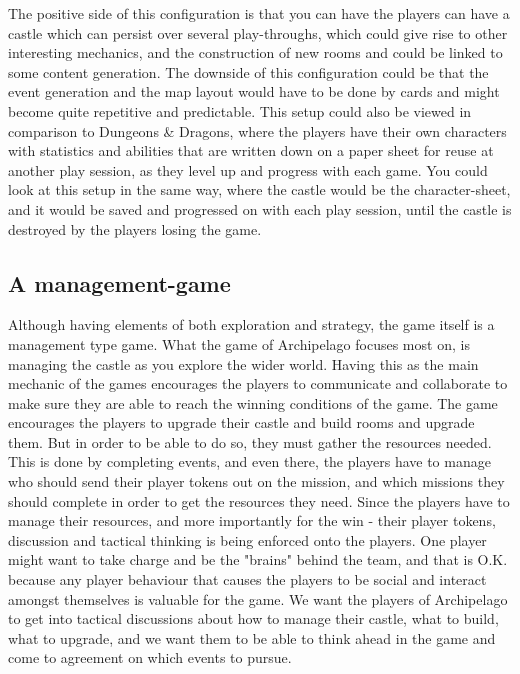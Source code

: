 The positive side of this configuration is that you can have the players can have a castle which can persist over several play-throughs, which could give rise to other interesting mechanics, and the construction of new rooms and could be linked to some content generation. 
The downside of this configuration could be that the event generation and the map layout would have to be done by cards and might become quite repetitive and predictable. This setup could also be viewed in comparison to Dungeons \& Dragons\cite{game:dnd}, where the players have their own characters with statistics and abilities that are written down on a paper sheet for reuse at another play session, as they level up and progress with each game. You could look at this setup in the same way, where the castle would be the character-sheet, and it would be saved and progressed on with each play session, until the castle is destroyed by the players losing the game.

\subsection{A management-game}
\label{sec:management}
Although having elements of both exploration and strategy, the game itself is a management type game. What the game of Archipelago focuses most on, is managing the castle as you explore the wider world. Having this as the main mechanic of the games encourages the players to communicate and collaborate to make sure they are able to reach the winning conditions of the game. The game encourages the players to upgrade their castle and build rooms and upgrade them. But in order to be able to do so, they must gather the resources needed. This is done by completing events, and even there, the players have to manage who should send their player tokens out on the mission, and which missions they should complete in order to get the resources they need. Since the players have to manage their resources, and more importantly for the win - their player tokens, discussion and tactical thinking is being enforced onto the players. One player might want to take charge and be the "brains" behind the team, and that is O.K. because any player behaviour that causes the players to be social and interact amongst themselves is valuable for the game. We want the players of Archipelago to get into tactical discussions about how to manage their castle, what to build, what to upgrade, and we want them to be able to think ahead in the game and come to agreement on which events to pursue. 

